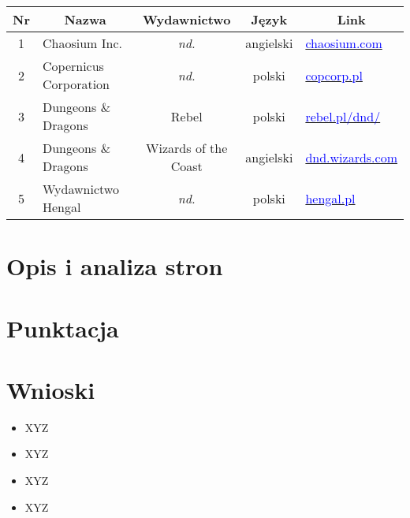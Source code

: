 \documentclass[a4paper,11pt]{article}
\begin{document}
\begin{tabular}{|c|l|c|c|l|}
	\hline
	\multicolumn{1}{|c}{\textbf{Nr}} & \multicolumn{1}{|c}{\textbf{Nazwa}} & \multicolumn{1}{|c}{\textbf{Wydawnictwo}} &\multicolumn{1}{|c}{\textbf{Język}} &\multicolumn{1}{|c|}{\textbf{Link}}\\
	\hline
	\hline
	1 & Chaosium Inc. & \textit{nd.} & angielski & \href{https://www.chaosium.com}{\textcolor{blue}{chaosium.com}} \\
	\hline
	2 & Copernicus Corporation & \textit{nd.} & polski & \href{https://copcorp.pl}{\textcolor{blue}{copcorp.pl}} \\
	\hline
	3 & Dungeons \& Dragons & Rebel & polski & \href{https://www.rebel.pl/dnd/}{\textcolor{blue}{rebel.pl/dnd/}} \\
	\hline
	4 & Dungeons \& Dragons & Wizards of the Coast & angielski & \href{https://dnd.wizards.com}{\textcolor{blue}{dnd.wizards.com}} \\
	\hline
	5 & Wydawnictwo Hengal & \textit{nd.} & polski & \href{https://hengal.pl}{\textcolor{blue}{hengal.pl}} \\
	\hline
\end{tabular}



\section {Opis i analiza stron}

\section {Punktacja}

\section {Wnioski}
\begin{itemize}
	\item XYZ
	\item XYZ
	\item XYZ
	\item XYZ
\end{itemize} 
\end{document}
